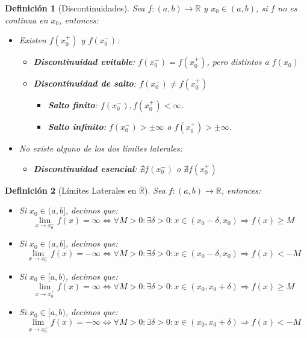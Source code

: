 \documentclass[10pt,a4paper,openright]{book}
\theoremstyle{break}
\newtheorem{defi}{Definición}[chapter]
\begin{document}
\begin{defi}[Discontinuidades]
Sea $f: (a,b)\longrightarrow \mathbb R$ y $x_0\in (a,b)$, si $f$ no es continua en $x_0$, entonces:
\begin{itemize}
\item Existen $f(x_0^+)$ y $f(x_0^-)$:
	\begin{itemize}
	\item \textbf{Discontinuidad evitable}: $f(x_0^-)=f(x_0^+)$, pero distintos a $f(x_0)$
	\item \textbf{Discontinuidad de salto}: $f(x_0^-)\neq f(x_0^+)$
		\begin{itemize}
		\item \textbf{Salto finito}: $f(x_0^-), f(x_0^+) < \infty$.
		\item \textbf{Salto infinito}: $f(x_0^-) > \pm\infty$ o $f(x_0^+) > \pm\infty$.
		\end{itemize}
	\end{itemize}
	
\item No existe alguno de los dos límites laterales:
	\begin{itemize}
	\item \textbf{Discontinuidad esencial}: $\nexists f(x_0^-)$ o $\nexists f(x_0^+)$
	\end{itemize}
\end{itemize}
\end{defi}

\begin{defi}[Límites Laterales en $\bar{\mathbb{R}}$]
Sea $f: (a,b)\longrightarrow \mathbb R$, entonces:
\begin{itemize}
\item Si $x_0\in (a,b]$, decimos que:
$$\lim_{x\rightarrow x_0^-}f(x)=\infty\Leftrightarrow \forall M>0: \exists \delta>0: x\in (x_0-\delta, x_0)\Rightarrow f(x)\geq M$$

\item Si $x_0\in (a,b]$, decimos que:
$$\lim_{x\rightarrow x_0^-}f(x)=-\infty\Leftrightarrow \forall M>0: \exists \delta>0: x\in (x_0-\delta, x_0)\Rightarrow f(x)< -M$$

\item Si $x_0\in [a,b)$, decimos que:
$$\lim_{x\rightarrow x_0^+}f(x)=\infty\Leftrightarrow \forall M>0: \exists \delta>0: x\in (x_0,x_0+\delta)\Rightarrow f(x)\geq M$$

\item Si $x_0\in [a,b)$, decimos que:
$$\lim_{x\rightarrow x_0^+}f(x)=-\infty\Leftrightarrow \forall M>0: \exists \delta>0: x\in (x_0,x_0+\delta)\Rightarrow f(x)< -M$$
\end{itemize}
\end{defi}
\end{document}
